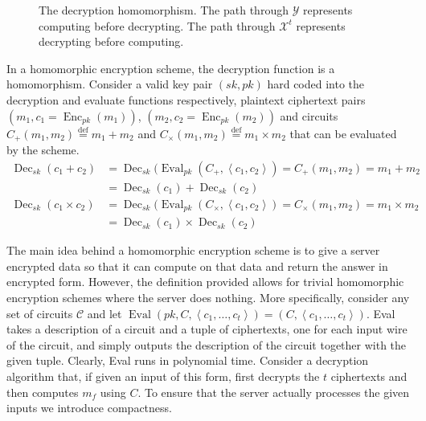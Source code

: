 \begin{figure}
    
    \caption{The decryption homomorphism. The path through $\mathcal{Y}$ represents computing before decrypting. The path through $\mathcal{X}^t$ represents decrypting before computing.}
    \label{fig:homomorphism}
\end{figure}

In a homomorphic encryption scheme, the decryption function is a homomorphism. Consider a valid key pair $(sk,pk)$ hard coded into the decryption and evaluate functions respectively, plaintext ciphertext pairs $(m_1,c_1 = \operatorname{Enc}_{pk}(m_1))$, $(m_2, c_2 = \operatorname{Enc}_{pk}(m_2))$ and circuits $C_+(m_1,m_2) \stackrel{\mathrm{def}}{=} m_1 + m_2$ and $C_{\times}(m_1,m_2) \stackrel{\mathrm{def}}{=} m_1 \times m_2$ that can be evaluated by the scheme. 
\begin{equation*}
\begin{aligned}
\operatorname{Dec}_{sk}(c_1 + c_2) &= \operatorname{Dec}_{sk}(\operatorname{Eval}_{pk}(C_+,\left\langle c_1,c_2 \right \rangle) = C_+(m_1,m_2) = m_1 + m_2 \\
    & = \operatorname{Dec}_{sk}(c_1) + \operatorname{Dec}_{sk}(c_2)\\
\operatorname{Dec}_{sk}(c_1 \times c_2) &= \operatorname{Dec}_{sk}(\operatorname{Eval}_{pk}(C_{\times},\left\langle c_1,c_2 \right \rangle) = C_{\times}(m_1,m_2) = m_1 \times m_2 \\
    & = \operatorname{Dec}_{sk}(c_1) \times \operatorname{Dec}_{sk}(c_2)
\end{aligned}
\end{equation*}

The main idea behind a homomorphic encryption scheme is to give a server encrypted data so that it can compute on that data and return the answer in encrypted form. However, the definition provided allows for trivial homomorphic encryption schemes where the server does nothing. More specifically, consider any set of circuits $\mathcal{C}$ and let $\operatorname{Eval}(pk, C,\left\langle c_1, \dots ,c_t \right\rangle) = (C, \left\langle c_1, \dots, c_t \right \rangle)$. Eval takes a description of a circuit and a tuple of ciphertexts, one for each input wire of the circuit, and simply outputs the description of the circuit together with the given tuple. Clearly, Eval runs in polynomial time. Consider a decryption algorithm that, if given an input of this form, first decrypts the $t$ ciphertexts and then computes $m_f$ using $C$. To ensure that the server actually processes the given inputs we introduce compactness.

